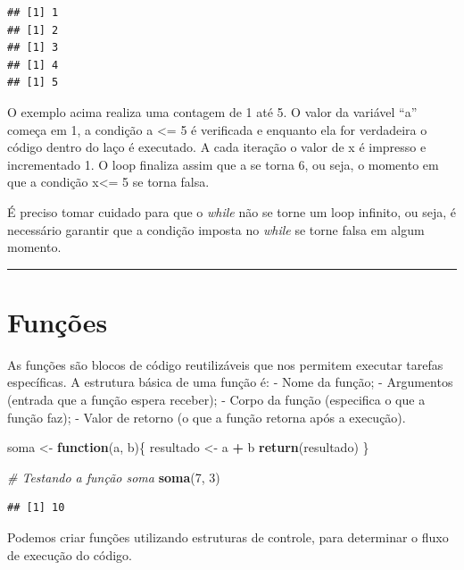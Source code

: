 \documentclass[
]{book}
\newenvironment{Shaded}{\begin{snugshade}}{\end{snugshade}}
\newcommand{\CommentTok}[1]{\textcolor[rgb]{0.56,0.35,0.01}{\textit{#1}}}
\newcommand{\ControlFlowTok}[1]{\textcolor[rgb]{0.13,0.29,0.53}{\textbf{#1}}}
\newcommand{\DecValTok}[1]{\textcolor[rgb]{0.00,0.00,0.81}{#1}}
\newcommand{\FunctionTok}[1]{\textcolor[rgb]{0.13,0.29,0.53}{\textbf{#1}}}
\newcommand{\NormalTok}[1]{#1}
\newcommand{\OtherTok}[1]{\textcolor[rgb]{0.56,0.35,0.01}{#1}}
\newcommand{\SpecialCharTok}[1]{\textcolor[rgb]{0.81,0.36,0.00}{\textbf{#1}}}
\begin{document}
\begin{verbatim}
## [1] 1
## [1] 2
## [1] 3
## [1] 4
## [1] 5
\end{verbatim}

O exemplo acima realiza uma contagem de 1 até 5. O valor da variável ``a'' começa em 1, a condição a \textless= 5 é verificada e enquanto ela for verdadeira o código dentro do laço é executado. A cada iteração o valor de x é impresso e incrementado 1. O loop finaliza assim que a se torna 6, ou seja, o momento em que a condição x\textless= 5 se torna falsa.

É preciso tomar cuidado para que o \emph{while} não se torne um loop infinito, ou seja, é necessário garantir que a condição imposta no \emph{while} se torne falsa em algum momento.

\begin{center}\rule{0.5\linewidth}{0.5pt}\end{center}

\section{Funções}\label{funuxe7uxf5es}

As funções são blocos de código reutilizáveis que nos permitem executar tarefas específicas.
A estrutura básica de uma função é:
- Nome da função;
- Argumentos (entrada que a função espera receber);
- Corpo da função (especifica o que a função faz);
- Valor de retorno (o que a função retorna após a execução).

\begin{Shaded}
\begin{Highlighting}[]
\NormalTok{soma }\OtherTok{\textless{}{-}} \ControlFlowTok{function}\NormalTok{(a, b)\{}
\NormalTok{  resultado }\OtherTok{\textless{}{-}}\NormalTok{ a }\SpecialCharTok{+}\NormalTok{ b}
  \FunctionTok{return}\NormalTok{(resultado)}
\NormalTok{  \}}

\CommentTok{\# Testando a função \textquotesingle{}soma\textquotesingle{}}
\FunctionTok{soma}\NormalTok{(}\DecValTok{7}\NormalTok{, }\DecValTok{3}\NormalTok{)}
\end{Highlighting}
\end{Shaded}

\begin{verbatim}
## [1] 10
\end{verbatim}

Podemos criar funções utilizando estruturas de controle, para determinar o fluxo de execução do código.
\end{document}
